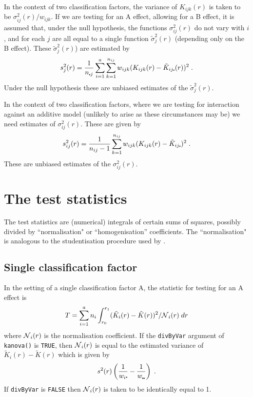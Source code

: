 \documentclass[12pt]{article}
\newcommand{\pt}{\mbox{\scalebox{0.4}{$\bullet$}}}
\newcommand{\sco}{\mbox{$\cal N$}}
\begin{document}
In the context of two classification factors, the variance of
$K_{ijk}(r)$ is taken to be $\sigma_{ij}^2(r)/w_{ijk}$.  If we
are testing for an A effect, allowing for a B effect, it is assumed
that, under the null hypothesis, the functions $\sigma_{ij}^2(r)$
do not vary with $i$, and for each $j$ are all equal to a single
function $\tilde{\sigma}_j^2(r)$ (depending only on the B effect).  These
$\tilde{\sigma}^2_j(r)$) are estimated by
\[
s^2_j(r) = \frac{1}{n_{\pt j}} \sum_{i=1}^a \sum_{k=1}^{n_{ij}}
                               w_{ijk}(K_{ijk}(r) - \tilde{K}_{ij\pt}(r))^2 \; .
\]
Under the null hypothesis these are unbiased estimates of the $\tilde{\sigma}^2_j(r)$.

In the context of two classification factors, where we are testing for
interaction against an additive model (unlikely to arise as these circumstances
may be) we need estimates of $\sigma^2_{ij}(r)$.  These are given by
\[
s^2_{ij}(r) = \frac{1}{n_{ij} - 1} \sum_{k=1}^{n_{ij}} w_{ijk}(K_{ijk}(r)
                                            - \tilde{K}_{ij\pt})^2 \; .
\]
These are unbiased estimates of the $\sigma^2_{ij}(r)$.

\section{The test statistics}
\label{sec:teststats}

The test statistics are (numerical) integrals of certain sums of
squares, possibly divided by ``normalisation" or ``homogenisation''
coefficients.  The ``normalisation" is analogous to the
studentisation procedure used by \cite{Hahn2012}.

\subsection{Single classification factor}
\label{sec:teststats.scf}

In the setting of a single classification factor A, the statistic
for testing for an A effect is
\[
T = \sum_{i=1}^a n_i \int_{r_0}^{r_1} (\tilde{K}_i(r) - 
                 \tilde{K}(r))^2/\sco_i(r) \; dr
\]
where $\sco_i(r)$ is the normalisation coefficient.  If the
\texttt{divByVar} argument of \texttt{kanova()} is \texttt{TRUE},
then $\sco_i(r)$ is equal to the estimated variance of $\tilde{K}_i(r)
- \tilde{K}(r)$ which is given by
\[
s^2(r) \left ( \frac{1}{w_i \pt} - \frac{1}{w_{\pt \pt}} \right ) \; .
\]
If \texttt{divByVar} is \texttt{FALSE} then $\sco_i(r)$ is taken to
be identically equal to 1.
\end{document}
